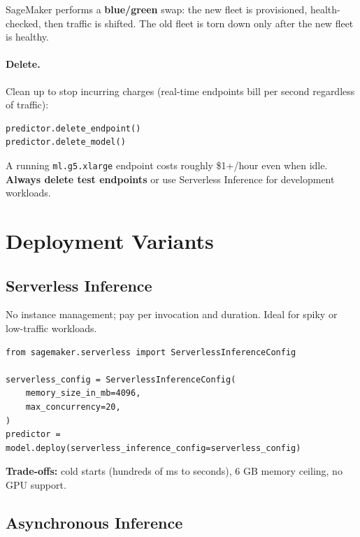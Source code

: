 \documentclass[11pt,a4paper]{article}
\begin{document}
SageMaker performs a \textbf{blue/green} swap: the new fleet is provisioned,
health-checked, then traffic is shifted. The old fleet is torn down only after
the new fleet is healthy.

\paragraph{Delete.} Clean up to stop incurring charges (real-time endpoints
bill per second regardless of traffic):

\begin{lstlisting}[style=pycode]
predictor.delete_endpoint()
predictor.delete_model()
\end{lstlisting}

\begin{warnbox}
A running \texttt{ml.g5.xlarge} endpoint costs roughly \$1+/hour even when
idle. \textbf{Always delete test endpoints} or use Serverless Inference for
development workloads.
\end{warnbox}

\section{Deployment Variants}

\subsection{Serverless Inference}

No instance management; pay per invocation and duration. Ideal for spiky or
low-traffic workloads.

\begin{lstlisting}[style=pycode]
from sagemaker.serverless import ServerlessInferenceConfig

serverless_config = ServerlessInferenceConfig(
    memory_size_in_mb=4096,
    max_concurrency=20,
)
predictor = model.deploy(serverless_inference_config=serverless_config)
\end{lstlisting}

\textbf{Trade-offs:} cold starts (hundreds of ms to seconds), 6 GB memory ceiling,
no GPU support.

\subsection{Asynchronous Inference}
\end{document}
